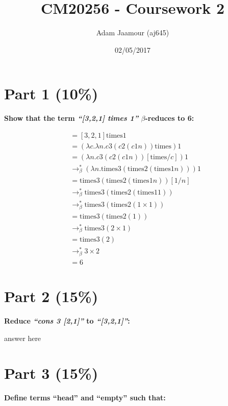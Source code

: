 \documentclass{article}
\title{CM20256 - Coursework 2}
\date{02/05/2017}
\author{Adam Jaamour (aj645)}
\begin{document}
	\newcommand{\lamb}{$\lambda$}
	\newcommand{\la}{\lambda}
	\newcommand{\be}{$\beta$}
	\newcommand{\tim}{\text{times}}
	\newcommand{\sa}{\quad}
	\newcommand{\equals}{\rightarrow_\beta^*}
	\newcommand{\equalsT}{\sa \rightarrow_\beta^*\sa}
	
	\maketitle
	\newpage
	
	
	\section{Part 1 (10\%)}
	\textbf{Show that the term \textit{``[3,2,1] times 1''} $\beta$-reduces to 6:}

	\begin{align*}
		&= [3,2,1] \tim 1 \\
		&= (\la c. \la n . c3(c2(c 1 n)) \tim ) 1 \\
		&= (\la n . c3(c2(c 1 n)) [\tim / c ] ) 1 \\
		&\equals (\la n . \tim 3(\tim 2(\tim 1 n))) 1 \\
		&= \tim 3(\tim 2(\tim 1 n)) [1/n] \\
		&\equals \tim 3(\tim 2(\tim 1 1)) \\
		&\equals \tim 3(\tim 2(1 \times 1)) \\
		&= \tim 3(\tim 2(1)) \\
		&\equals \tim 3(2 \times 1) \\
		&= \tim 3(2) \\
		&\equals 3 \times 2 \\
		&= 6
	\end{align*}
	
	
	
	\section{Part 2 (15\%)}
	\textbf{Reduce \textit{``cons 3 [2,1]''} to \textit{``[3,2,1]''}:}
	
	answer here
	
	
	\section{Part 3 (15\%)}
	\textbf{Define terms ``head'' and ``empty'' such that:}
	
\end{document}
